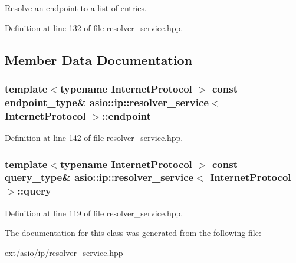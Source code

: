 Resolve an endpoint to a list of entries. 



Definition at line 132 of file resolver\+\_\+service.\+hpp.



\subsection{Member Data Documentation}
\hypertarget{classasio_1_1ip_1_1resolver__service_a14162d17bcfa5a3e87b455caca632986}{}
\subsubsection[{endpoint}]{\setlength{\rightskip}{0pt plus 5cm}template$<$typename Internet\+Protocol $>$ const {\bf endpoint\+\_\+type}\& {\bf asio\+::ip\+::resolver\+\_\+service}$<$ Internet\+Protocol $>$\+::endpoint}\label{classasio_1_1ip_1_1resolver__service_a14162d17bcfa5a3e87b455caca632986}


Definition at line 142 of file resolver\+\_\+service.\+hpp.

\hypertarget{classasio_1_1ip_1_1resolver__service_a150f786d8c12263e29e85662f4f8ed34}{}
\subsubsection[{query}]{\setlength{\rightskip}{0pt plus 5cm}template$<$typename Internet\+Protocol $>$ const {\bf query\+\_\+type}\& {\bf asio\+::ip\+::resolver\+\_\+service}$<$ Internet\+Protocol $>$\+::query}\label{classasio_1_1ip_1_1resolver__service_a150f786d8c12263e29e85662f4f8ed34}


Definition at line 119 of file resolver\+\_\+service.\+hpp.



The documentation for this class was generated from the following file\+:\begin{DoxyCompactItemize}
\item 
ext/asio/ip/\hyperlink{ip_2resolver__service_8hpp}{resolver\+\_\+service.\+hpp}\end{DoxyCompactItemize}
